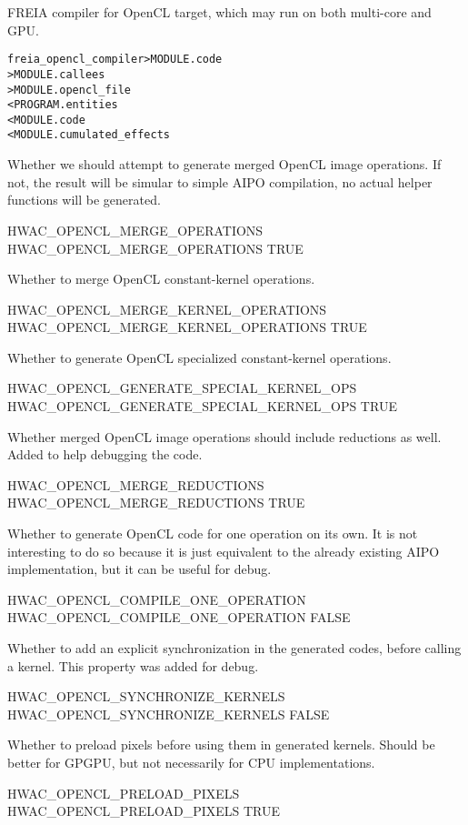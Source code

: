 \documentclass[a4paper]{report}
\newenvironment{PipsMake}{\begin{alltt}}{\end{alltt}}
\begin{document}
FREIA compiler for OpenCL target, which may run on both multi-core and GPU.

\begin{PipsMake}
freia_opencl_compiler  > MODULE.code
                       > MODULE.callees
                       > MODULE.opencl_file
        < PROGRAM.entities
        < MODULE.code
        < MODULE.cumulated_effects
\end{PipsMake}

Whether we should attempt to generate merged OpenCL image operations.
If not, the result will be simular to simple AIPO compilation,
no actual helper functions will be generated.
\begin{PipsProp}{HWAC_OPENCL_MERGE_OPERATIONS}
HWAC_OPENCL_MERGE_OPERATIONS TRUE
\end{PipsProp}

Whether to merge OpenCL constant-kernel operations.
\begin{PipsProp}{HWAC_OPENCL_MERGE_KERNEL_OPERATIONS}
HWAC_OPENCL_MERGE_KERNEL_OPERATIONS TRUE
\end{PipsProp}

Whether to generate OpenCL specialized constant-kernel operations.
\begin{PipsProp}{HWAC_OPENCL_GENERATE_SPECIAL_KERNEL_OPS}
HWAC_OPENCL_GENERATE_SPECIAL_KERNEL_OPS TRUE
\end{PipsProp}

Whether merged OpenCL image operations should include reductions as well.
Added to help debugging the code.
\begin{PipsProp}{HWAC_OPENCL_MERGE_REDUCTIONS}
HWAC_OPENCL_MERGE_REDUCTIONS TRUE
\end{PipsProp}

Whether to generate OpenCL code for one operation on its own.
It is not interesting to do so because it is just equivalent to
the already existing AIPO implementation, but it can be useful for
debug.
\begin{PipsProp}{HWAC_OPENCL_COMPILE_ONE_OPERATION}
HWAC_OPENCL_COMPILE_ONE_OPERATION FALSE
\end{PipsProp}

Whether to add an explicit synchronization in the generated codes,
before calling a kernel. This property was added for debug.
\begin{PipsProp}{HWAC_OPENCL_SYNCHRONIZE_KERNELS}
HWAC_OPENCL_SYNCHRONIZE_KERNELS FALSE
\end{PipsProp}

Whether to preload pixels before using them in generated kernels.
Should be better for GPGPU, but not necessarily for CPU implementations.
\begin{PipsProp}{HWAC_OPENCL_PRELOAD_PIXELS}
HWAC_OPENCL_PRELOAD_PIXELS TRUE
\end{PipsProp}
\end{document}
